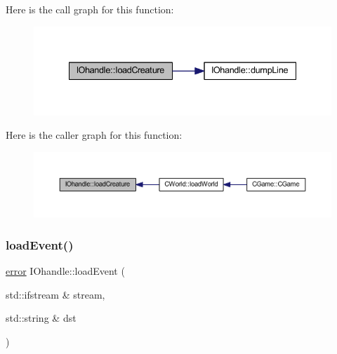 Here is the call graph for this function\+:\nopagebreak
\begin{figure}[H]
\begin{center}
\leavevmode
\includegraphics[width=335pt]{class_i_ohandle_a99dd11dfe48cea80e164a9d7477aad5f_cgraph}
\end{center}
\end{figure}
Here is the caller graph for this function\+:\nopagebreak
\begin{figure}[H]
\begin{center}
\leavevmode
\includegraphics[width=350pt]{class_i_ohandle_a99dd11dfe48cea80e164a9d7477aad5f_icgraph}
\end{center}
\end{figure}
\mbox{\label{class_i_ohandle_a42f66760fa3e33400921dcb8d9a8cd57}} 
\subsubsection{\texorpdfstring{load\+Event()}{loadEvent()}}
{\footnotesize\ttfamily \mbox{\hyperlink{_errors_list_8h_af10dacfa214e2575bb2e0ee407c242e0}{error}} I\+Ohandle\+::load\+Event (\begin{DoxyParamCaption}\item[{std\+::ifstream \&}]{stream,  }\item[{std\+::string \&}]{dst }\end{DoxyParamCaption})}

